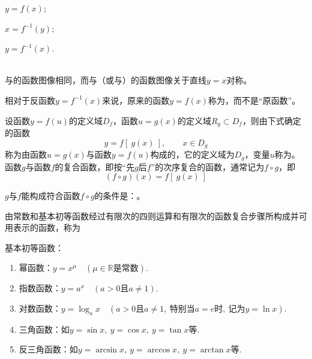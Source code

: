 \documentclass[lang=cn,10pt]{elegantbook}
\newcommand{\R}{\mathbb{R}}
\begin{document}
\begin{note}
	\begin{enumerate*}[label=\Circled{\arabic*}]
		\item \( y = f(x) \);\quad
		\item \( x = f^{-1}(y) \);\quad
		\item \( y = f^{-1}(x) \).
	\end{enumerate*}\\
	与的函数图像相同，而与（或与）的函数图像关于直线\( y = x \)对称。
\end{note}
\begin{remark}
	相对于反函数\( y=f^{-1}(x) \)来说，原来的函数\( y = f(x) \)称为，而不是``原函数''。
\end{remark}

\begin{definition}[复合函数]
	设函数\( y=f(u) \)的定义域\( D_{f} \)，函数\( u=g(x) \)的定义域\( R_{g} \subset D_{f} \)，则由下式确定的函数
	\[ y = f[\ g(x)\ ],\qquad x \in D_{g} \]
	称为由函数\( u = g(x) \)与函数\( y = f(u) \)构成的，它的定义域为\( D_{g} \)，变量\( u \)称为。
	函数\( g \)与函数\( f \)的复合函数，即按``先\( g \)后\( f \)''的次序复合的函数，通常记为\( f \circ g \)，即
	\[ (f \circ g)(x) = f[\ g(x)\ ] \]
\end{definition}

\begin{note}
	\( g \)与\( f \)能构成符合函数\( f \circ g \)的条件是：。
\end{note}

\begin{definition}[初等函数]
	由常数和基本初等函数经过有限次的四则运算和有限次的函数复合步骤所构成并可用表示的函数，称为
\end{definition}

\begin{note}
	基本初等函数：
	\begin{enumerate}
		\item 幂函数：\( y = x^{\mu}\quad (\mu \in \R\text{是常数}) \).
		\item 指数函数：\( y = a^{x}\quad (a > 0 \text{且}a \neq 1) \).
		\item 对数函数：\( y = \log_{a}x\quad (a > 0 \text{且}a \neq 1,\ \text{特别当}a = e\text{时},\ \text{记为}y = \ln x) \).
		\item 三角函数：如\( y = \sin x,\ y = \cos x,\ y = \tan x \)等.
		\item 反三角函数：如\( y = \arcsin x,\ y = \arccos x,\ y = \arctan x \)等.
	\end{enumerate}
\end{note}
\end{document}
